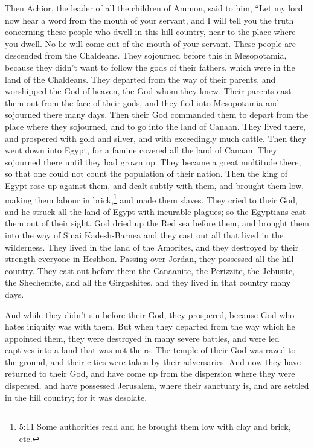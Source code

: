  Then Achior, the leader of all the children of Ammon, said
to him, ``Let my lord now hear a word from the mouth of your servant,
and I will tell you the truth concerning these people who dwell in this
hill country, near to the place where you dwell. No lie will come out of
the mouth of your servant.  These people are descended from
the Chaldeans.  They sojourned before this in Mesopotamia,
because they didn't want to follow the gods of their fathers, which were
in the land of the Chaldeans.  They departed from the way of
their parents, and worshipped the God of heaven, the God whom they knew.
Their parents cast them out from the face of their gods, and they fled
into Mesopotamia and sojourned there many days.  Then their
God commanded them to depart from the place where they sojourned, and to
go into the land of Canaan. They lived there, and prospered with gold
and silver, and with exceedingly much cattle.  Then they
went down into Egypt, for a famine covered all the land of Canaan. They
sojourned there until they had grown up. They became a great multitude
there, so that one could not count the population of their nation.
 Then the king of Egypt rose up against them, and dealt
subtly with them, and brought them low, making them labour in
brick,\footnote{5:11 Some authorities read and he brought them low with
  clay and brick, etc.} and made them slaves.  They cried
to their God, and he struck all the land of Egypt with incurable
plagues; so the Egyptians cast them out of their sight. 
God dried up the Red sea before them,  and brought them
into the way of Sinai Kadesh-Barnea and they cast out all that lived in
the wilderness.  They lived in the land of the Amorites,
and they destroyed by their strength everyone in Heshbon. Passing over
Jordan, they possessed all the hill country.  They cast out
before them the Canaanite, the Perizzite, the Jebusite, the Shechemite,
and all the Girgashites, and they lived in that country many days.

 And while they didn't sin before their God, they
prospered, because God who hates iniquity was with them. 
But when they departed from the way which he appointed them, they were
destroyed in many severe battles, and were led captives into a land that
was not theirs. The temple of their God was razed to the ground, and
their cities were taken by their adversaries.  And now they
have returned to their God, and have come up from the dispersion where
they were dispersed, and have possessed Jerusalem, where their sanctuary
is, and are settled in the hill country; for it was desolate.

